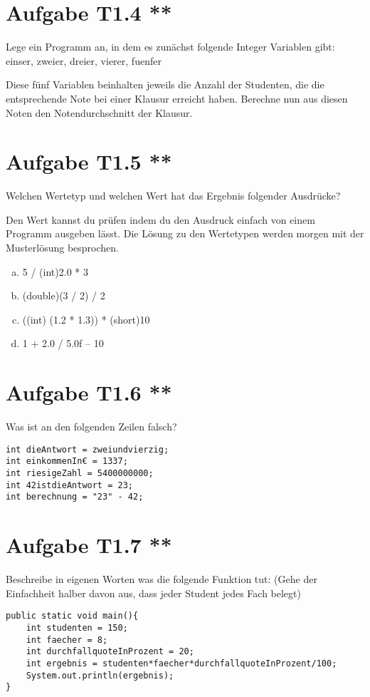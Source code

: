 \documentclass[final,a4paper]{article}
\begin{document}
\section*{Aufgabe T1.4 **}
Lege ein Programm an, in dem es zunächst folgende Integer Variablen gibt: einser, zweier, dreier, vierer, fuenfer

Diese fünf Variablen beinhalten jeweils die Anzahl der Studenten, die die entsprechende Note bei einer Klausur erreicht haben. Berechne nun aus diesen Noten den Notendurchschnitt der Klausur.

\section*{Aufgabe T1.5 **}
Welchen Wertetyp und welchen Wert hat das Ergebnis folgender Ausdrücke?

Den Wert kannst du prüfen indem du den Ausdruck einfach von einem Programm ausgeben lässt. Die Lösung zu den Wertetypen werden morgen mit der Musterlösung besprochen.
\begin{enumerate}[(a)]
\item 5 / (int)2.0 * 3
\item (double)(3 / 2) / 2
\item ((int) (1.2 * 1.3)) * (short)10
\item 1 + 2.0 / 5.0f – 10
\end{enumerate}

\section*{Aufgabe T1.6 **}
Was ist an den folgenden Zeilen falsch?
\begin{lstlisting}
int dieAntwort = zweiundvierzig;
int einkommenIn€ = 1337;
int riesigeZahl = 5400000000;
int 42istdieAntwort = 23;
int berechnung = "23" - 42;
\end{lstlisting}

\section*{Aufgabe T1.7 **}
Beschreibe in eigenen Worten was die folgende Funktion tut:
(Gehe der Einfachheit halber davon aus, dass jeder Student jedes Fach belegt)
\begin{lstlisting}
public static void main(){
	int studenten = 150;
	int faecher = 8;
	int durchfallquoteInProzent = 20;
	int ergebnis = studenten*faecher*durchfallquoteInProzent/100;
	System.out.println(ergebnis);
}
\end{lstlisting}
\end{document}
